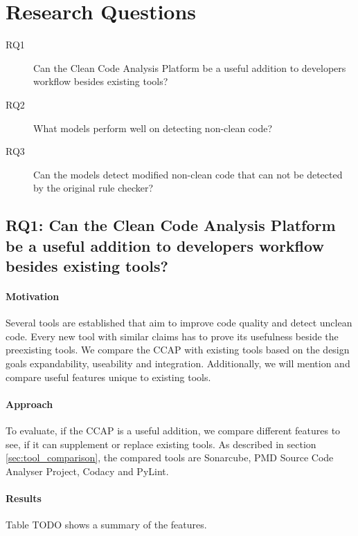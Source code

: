 \section{Research Questions}

\begin{description}
    \item[RQ1] Can the Clean Code Analysis Platform be a useful addition to developers workflow besides existing tools? 
    \item[RQ2] What models perform well on detecting non-clean code?
    \item[RQ3] Can the models detect modified non-clean code that can not be detected by the original rule checker? 
\end{description}

\subsection{RQ1: Can the Clean Code Analysis Platform be a useful addition to developers workflow besides existing tools?}
\paragraph{Motivation}
Several tools are established that aim to improve code quality and detect unclean code. Every new tool with similar claims has to prove its usefulness beside the preexisting tools. We compare the CCAP with existing tools based on the design goals expandability, useability and integration. Additionally, we will mention and compare useful features unique to existing tools.
\paragraph{Approach}
To evaluate, if the CCAP is a useful addition, we compare different features to see, if it can supplement or replace existing tools. As described in section \ref{sec:tool_comparison}, the compared tools are Sonarcube, PMD Source Code Analyser Project, Codacy and PyLint.

\paragraph{Results}
Table TODO shows a summary of the features.

